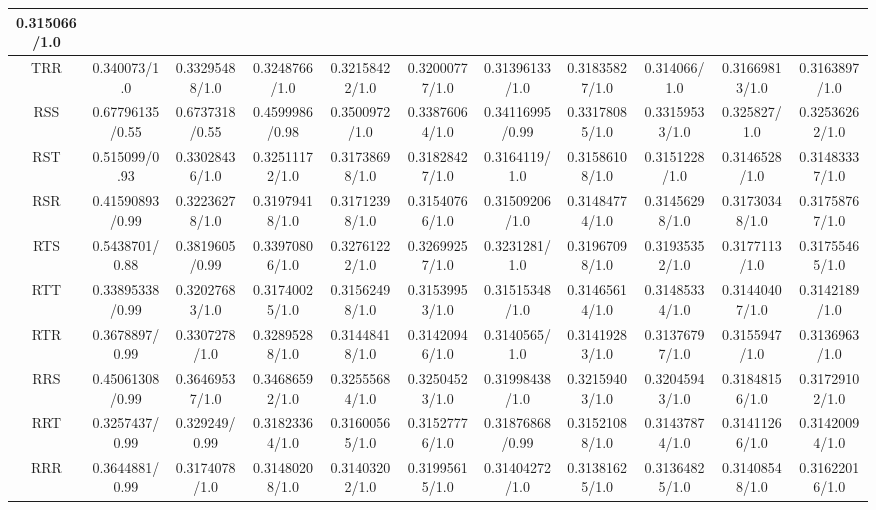 \documentclass{article}
\begin{document}
\begin{table}[H]
{\begin{tabular}{|c|c|c|c|c|c|c|c|c|c|c|}
0.315066/1.0  \\
        \hline
        TRR & 0.340073/1.0 & 
0.33295488/1.0 & 
0.3248766/1.0 & 
0.32158422/1.0 & 
0.32000777/1.0 & 
\cellcolor{blue!25} 0.31396133/1.0 & 
0.31835827/1.0 & 
0.314066/1.0 & 
0.31669813/1.0 & 
0.3163897/1.0  \\
        \hline
        RSS & 0.67796135/0.55 & 
0.6737318/0.55 & 
0.4599986/0.98 & 
0.3500972/1.0 & 
0.33876064/1.0 & 
0.34116995/0.99 & 
0.33178085/1.0 & 
0.33159533/1.0 & 
0.325827/1.0 & 
\cellcolor{blue!25} 0.32536262/1.0  \\
        \hline
        RST & 0.515099/0.93 & 
0.33028436/1.0 & 
0.32511172/1.0 & 
0.31738698/1.0 & 
0.31828427/1.0 & 
0.3164119/1.0 & 
0.31586108/1.0 & 
0.3151228/1.0 & 
\cellcolor{blue!25} 0.3146528/1.0 & 
0.31483337/1.0  \\
        \hline
        RSR & 0.41590893/0.99 & 
0.32236278/1.0 & 
0.31979418/1.0 & 
0.31712398/1.0 & 
0.31540766/1.0 & 
0.31509206/1.0 & 
0.31484774/1.0 & 
\cellcolor{blue!25} 0.31456298/1.0 & 
0.31730348/1.0 & 
0.31758767/1.0  \\
        \hline
        RTS & 0.5438701/0.88 & 
0.3819605/0.99 & 
0.33970806/1.0 & 
0.32761222/1.0 & 
0.32699257/1.0 & 
0.3231281/1.0 & 
0.31967098/1.0 & 
0.31935352/1.0 & 
0.3177113/1.0 & 
\cellcolor{blue!25} 0.31755465/1.0  \\
        \hline
        RTT & 0.33895338/0.99 & 
0.32027683/1.0 & 
0.31740025/1.0 & 
0.31562498/1.0 & 
0.31539953/1.0 & 
0.31515348/1.0 & 
0.31465614/1.0 & 
0.31485334/1.0 & 
0.31440407/1.0 & 
\cellcolor{blue!25} 0.3142189/1.0  \\
        \hline
        RTR & 0.3678897/0.99 & 
0.3307278/1.0 & 
0.32895288/1.0 & 
0.31448418/1.0 & 
0.31420946/1.0 & 
0.3140565/1.0 & 
0.31419283/1.0 & 
0.31376797/1.0 & 
0.3155947/1.0 & 
\cellcolor{blue!25} 0.3136963/1.0  \\
        \hline
        RRS & 0.45061308/0.99 & 
0.36469537/1.0 & 
0.34686592/1.0 & 
0.32555684/1.0 & 
0.32504523/1.0 & 
0.31998438/1.0 & 
0.32159403/1.0 & 
0.32045943/1.0 & 
0.31848156/1.0 & 
\cellcolor{blue!25} 0.31729102/1.0 \\
        \hline
        RRT & 0.3257437/0.99 & 
0.329249/0.99 & 
0.31823364/1.0 & 
0.31600565/1.0 & 
0.31527776/1.0 & 
0.31876868/0.99 & 
0.31521088/1.0 & 
0.31437874/1.0 & 
\cellcolor{blue!25} 0.31411266/1.0 & 
0.31420094/1.0  \\
        \hline
        RRR & 0.3644881/0.99 & 
0.3174078/1.0 & 
0.31480208/1.0 & 
0.31403202/1.0 & 
0.31995615/1.0 & 
0.31404272/1.0 & 
0.31381625/1.0 & 
\cellcolor{blue!25} 0.31364825/1.0 & 
0.31408548/1.0 & 
0.31622016/1.0 \\
        \hline
        
\end{tabular}%
}
\end{table}
\end{document}
